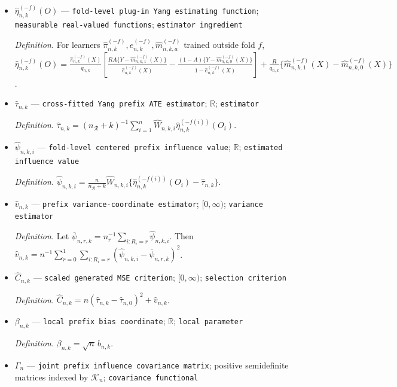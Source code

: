 \documentclass{article}
\begin{document}
\begin{itemize}
  \item \(\widehat\eta_{n,k}^{(-f)}(O)\) --- \texttt{fold-\allowbreak{}level plug-\allowbreak{}in Yang estimating function}; \texttt{measurable real-\allowbreak{}valued functions}; \texttt{estimator ingredient}
  \par\smallskip\noindent\emph{Definition.} For learners \(\widehat\pi_{n,k}^{(-f)},\widehat e_{n,k}^{(-f)},\widehat m_{n,k,a}^{(-f)}\) trained outside fold \(f\), \(\widehat\eta_{n,k}^{(-f)}(O)=\frac{\widehat\pi_{n,k}^{(-f)}(X)}{q_{n,k}}[\frac{RA\{Y-\widehat m_{n,k,1}^{(-f)}(X)\}}{\widehat e_{n,k}^{(-f)}(X)}-\frac{(1-A)\{Y-\widehat m_{n,k,0}^{(-f)}(X)\}}{1-\widehat e_{n,k}^{(-f)}(X)}]+\frac{R}{q_{n,k}}\{\widehat m_{n,k,1}^{(-f)}(X)-\widehat m_{n,k,0}^{(-f)}(X)\}\).
  \item \(\widehat\tau_{n,k}\) --- \texttt{cross-\allowbreak{}fitted Yang prefix ATE estimator}; \(\mathbb R\); \texttt{estimator}
  \par\smallskip\noindent\emph{Definition.} \(\widehat\tau_{n,k}=(n_{\mathcal R}+k)^{-1}\sum_{i=1}^n\widehat W_{n,k,i}\widehat\eta_{n,k}^{(-f(i))}(O_i)\).
  \item \(\widehat\psi_{n,k,i}\) --- \texttt{fold-\allowbreak{}level centered prefix influence value}; \(\mathbb R\); \texttt{estimated influence value}
  \par\smallskip\noindent\emph{Definition.} \(\widehat\psi_{n,k,i}=\frac{n}{n_{\mathcal R}+k}\widehat W_{n,k,i}\{\widehat\eta_{n,k}^{(-f(i))}(O_i)-\widehat\tau_{n,k}\}\).
  \item \(\widehat v_{n,k}\) --- \texttt{prefix variance-\allowbreak{}coordinate estimator}; \([0,\infty)\); \texttt{variance estimator}
  \par\smallskip\noindent\emph{Definition.} Let \(\overline\psi_{n,r,k}=n_r^{-1}\sum_{i:R_i=r}\widehat\psi_{n,k,i}\). Then \(\widehat v_{n,k}=n^{-1}\sum_{r=0}^1\sum_{i:R_i=r}(\widehat\psi_{n,k,i}-\overline\psi_{n,r,k})^2\).
  \item \(\widehat C_{n,k}\) --- \texttt{scaled generated MSE criterion}; \([0,\infty)\); \texttt{selection criterion}
  \par\smallskip\noindent\emph{Definition.} \(\widehat C_{n,k}=n(\widehat\tau_{n,k}-\widehat\tau_{n,0})^2+\widehat v_{n,k}\).
  \item \(\beta_{n,k}\) --- \texttt{local prefix bias coordinate}; \(\mathbb R\); \texttt{local parameter}
  \par\smallskip\noindent\emph{Definition.} \(\beta_{n,k}=\sqrt n\,b_{n,k}\).
  \item \(\Gamma_n\) --- \texttt{joint prefix influence covariance matrix}; positive semidefinite matrices indexed by \(\mathcal K_n\); \texttt{covariance functional}

\end{itemize}
\end{document}
